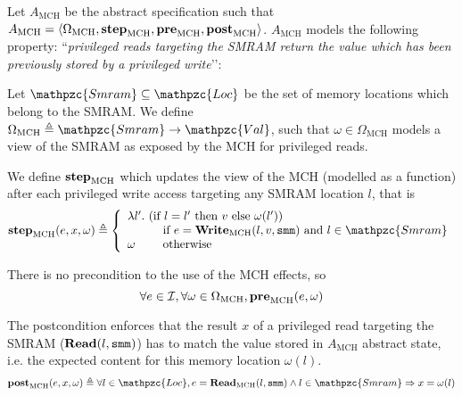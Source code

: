 \begin{example} \label{ex:mch-abs-specs} Let
  $A_{\mathrm{MCH}}$ be the abstract specification such that $A_{\mathrm{MCH}} = \langle
    \Omega_{\mathrm{MCH}}, \mathbf{\mathbf{step}}_{\mathrm{MCH}}, \mathbf{\mathbf{pre}}_{\mathrm{MCH}}, \mathbf{\mathbf{post}}_{\mathrm{MCH}}
    \rangle$.
  $A_{\mathrm{MCH}}$ models the following property: ``\emph{privileged reads
  targeting the SMRAM return the value which has been previously stored
  by a privileged write}’’:
  \begin{compactitem}
  \item Let $\mathpzc{Smram} \subseteq
    \mathpzc{Loc}$ be the set of memory locations which belong to the SMRAM.  We
    define $\Omega_{\mathrm{MCH}} \triangleq \mathpzc{Smram} \rightarrow
    \mathpzc{Val}$, such that $\omega \in \Omega_{\mathrm{MCH}}$ models a
    view of the SMRAM as exposed by the MCH for privileged reads.
  \item We define $\mathbf{\mathbf{step}}_{\mathrm{MCH}}$ which updates the view of the MCH
  (modelled as a function) after each privileged
  write access targeting any SMRAM location $l$, that is
    \[ \func{step}_{\mathrm{MCH}}(e, x, \omega) \triangleq \left\{
        \begin{array}{l}
          \lambda l'.  \text{ (if } l = l' \text{ then } v \text{ else } \omega(l')) \\
            \qquad\ \ \text{ if } e = \func{Write}_{\mathrm{MCH}}(l, v, \val{smm})
            \text{ and } l \in \mathpzc{Smram} \\
          \omega \qquad \text{ otherwise}
        \end{array}
      \right.
    \]
  \item There is no precondition to the use of the MCH effects, so \[ \forall e
  \in \mathcal{I},\forall \omega \in \Omega_{\mathrm{MCH}}, \mathbf{\mathbf{pre}}_{\mathrm{MCH}}(e,
  \omega) \]
  \item The postcondition enforces that the result $x$ of a privileged read
  targeting the SMRAM ($\mathbf{\mathbf{Read}}(l, \mathtt{smm})$) has to match the value
  stored in $A_{\mathrm{MCH}}$ abstract state, i.e. the expected content for
  this memory location $\omega(l)$.
    \[ \func{post}_{\mathrm{MCH}}(e, x, \omega) \triangleq \forall l \in \mathpzc{Loc}, e
      = \func{Read}_{\mathrm{MCH}}(l, \val{smm}) \wedge l \in \mathpzc{Smram}
      \Rightarrow x = \omega(l)
    \]
  \end{compactitem}
\end{example}


